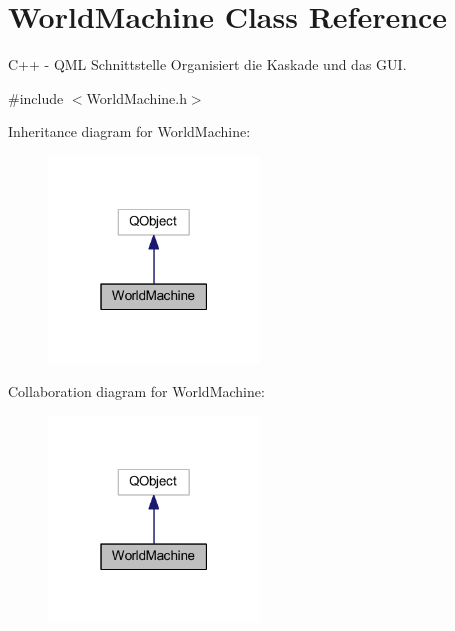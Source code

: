 \hypertarget{class_world_machine}{}\section{World\+Machine Class Reference}
\label{class_world_machine}


C++ -\/ Q\+ML Schnittstelle Organisiert die Kaskade und das G\+UI.  




{\ttfamily \#include $<$World\+Machine.\+h$>$}



Inheritance diagram for World\+Machine\+:\nopagebreak
\begin{figure}[H]
\begin{center}
\leavevmode
\includegraphics[width=159pt]{class_world_machine__inherit__graph}
\end{center}
\end{figure}


Collaboration diagram for World\+Machine\+:\nopagebreak
\begin{figure}[H]
\begin{center}
\leavevmode
\includegraphics[width=159pt]{class_world_machine__coll__graph}
\end{center}
\end{figure}
